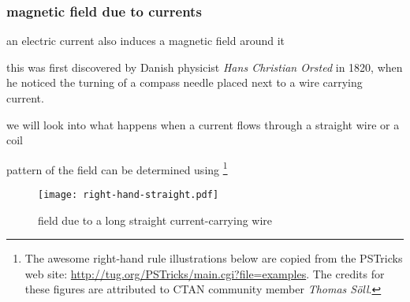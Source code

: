 \subsubsection{magnetic field due to currents}
an electric current also induces a magnetic field around it

this was first discovered by Danish physicist \emph{Hans Christian Orsted} in 1820, when he noticed the turning of a compass needle placed next to a wire carrying current.

we will look into what happens when a current flows through a straight wire or a coil

\cmt pattern of the field can be determined using \footnote{The awesome right-hand rule illustrations below are copied from the PSTricks web site: \url{http://tug.org/PSTricks/main.cgi?file=examples}. The credits for these figures are attributed to CTAN community member \emph{Thomas S\"{o}ll}.}

\begin{figure}[ht]
	\centering
\begin{minipage}{0.55\linewidth}
\begin{center}
\end{center}
\end{minipage}
\begin{minipage}{0.35\linewidth}
\begin{center}
\texttt{[image: right-hand-straight.pdf]}
\end{center}
\end{minipage}

\caption*{field due to a long straight current-carrying wire}
\end{figure}

